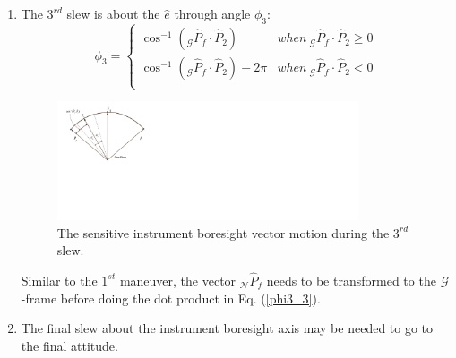 \documentclass[letterpaper, paper,12pt]{AAS}		%
\begin{document}
\begin{enumerate}
		
		\item The $3^{rd}$ slew is about the $\hat{e}$ through angle $\phi_3$:
		\begin{equation}\label{phi3_3}
		\phi_3=\left\{
		\begin{array}{ll}
		\cos^{-1}(_\mathcal{G}\hat{P}_f\cdot\hat{P}_2)& when\  _\mathcal{G}\hat{P}_f\cdot\hat{P}_2\geq 0\\
		\cos^{-1}(_\mathcal{G}\hat{P}_f\cdot\hat{P}_2)-2\pi& when\ _\mathcal{G}\hat{P}_f\cdot\hat{P}_2<0\\
		\end{array}
		\right.
		\end{equation}
		\begin{figure}[H]
			\begin{center}
				\includegraphics[width=3.5in]{./Figures/SVAS_4r}
					\caption{The sensitive instrument boresight vector motion during the $3^{rd}$ slew.}
			\end{center}
		\end{figure}
		Similar to the $1^{st}$ maneuver, the vector $_\mathcal{N}\hat{P}_f$ needs to be transformed to the $\mathcal{G}$-frame before doing the dot product in Eq. (\ref{phi3_3}). 
		\item The final slew about the instrument boresight axis may be needed to go to the final attitude. 
	\end{enumerate}
	
	
\end{document}
